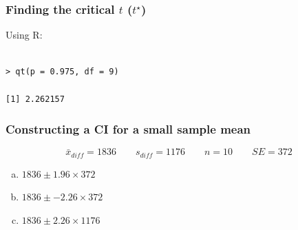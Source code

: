 \documentclass[notes,11pt, aspectratio=169]{beamer}
\begin{document}

\begin{frame}[fragile]
\frametitle{Finding the critical $t$ ($t^\star$)}


Using R:
\begin{verbatim}

> qt(p = 0.975, df = 9)

[1] 2.262157

\end{verbatim}

\end{frame}


\begin{frame}
\frametitle{Constructing a CI for a small sample mean}

\[ \bar{x}_{diff} = 1836 \qquad s_{diff} = 1176 \qquad n = 10 \qquad SE = 372 \]

{
\begin{enumerate}[(a)]

\item $1836 \pm 1.96 \times 372$


\item $1836 \pm -2.26 \times 372$

\item $1836 \pm 2.26 \times 1176$

\end{enumerate}
}
{
\vspace{0.25cm}
}

\end{frame}

\end{document}
